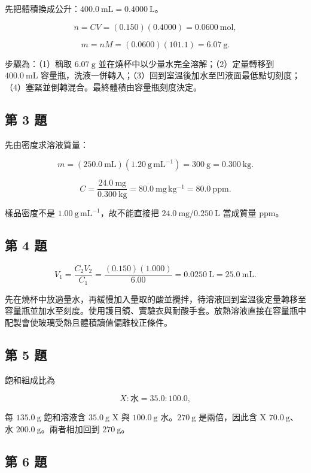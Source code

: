 \documentclass[11pt,a4paper]{article}
\begin{document}
先把體積換成公升：\(400.0\ \mathrm{mL}=0.4000\ \mathrm L\)。

\[
n=CV=(0.150)(0.4000)=0.0600\ \mathrm{mol},
\]

\[
m=nM=(0.0600)(101.1)=6.07\ \mathrm g.
\]

步驟為：（1）稱取 \(6.07\ \mathrm g\) 並在燒杯中以少量水完全溶解；（2）定量轉移到 \(400.0\ \mathrm{mL}\) 容量瓶，洗液一併轉入；（3）回到室溫後加水至凹液面最低點切刻度；（4）塞緊並倒轉混合。最終體積由容量瓶刻度決定。

\subsection{第 3 題}\label{ux7b2c-3-ux984c}

先由密度求溶液質量：

\[
m=(250.0\ \mathrm{mL})(1.20\ \mathrm{g\,mL^{-1}})
=300\ \mathrm g=0.300\ \mathrm{kg}.
\]

\[
C=\frac{24.0\ \mathrm{mg}}{0.300\ \mathrm{kg}}
=80.0\ \mathrm{mg\,kg^{-1}}=80.0\ \mathrm{ppm}.
\]

樣品密度不是 \(1.00\ \mathrm{g\,mL^{-1}}\)，故不能直接把 \(24.0\ \mathrm{mg}/0.250\ \mathrm L\) 當成質量 ppm。

\subsection{第 4 題}\label{ux7b2c-4-ux984c}

\[
V_1=\frac{C_2V_2}{C_1}
=\frac{(0.150)(1.000)}{6.00}
=0.0250\ \mathrm L=25.0\ \mathrm{mL}.
\]

先在燒杯中放適量水，再緩慢加入量取的酸並攪拌，待溶液回到室溫後定量轉移至容量瓶並加水至刻度。使用護目鏡、實驗衣與耐酸手套。放熱溶液直接在容量瓶中配製會使玻璃受熱且體積讀值偏離校正條件。

\subsection{第 5 題}\label{ux7b2c-5-ux984c}

飽和組成比為

\[
X:\text{水}=35.0:100.0,
\]

每 \(135.0\ \mathrm g\) 飽和溶液含 \(35.0\ \mathrm g\) X 與 \(100.0\ \mathrm g\) 水。\(270\ \mathrm g\) 是兩倍，因此含 X \(70.0\ \mathrm g\)、水 \(200.0\ \mathrm g\)。兩者相加回到 \(270\ \mathrm g\)。

\subsection{第 6 題}\label{ux7b2c-6-ux984c}
\end{document}
